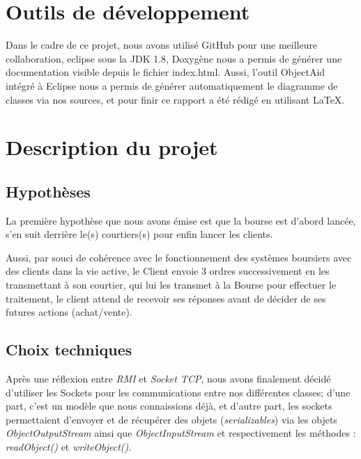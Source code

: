 \documentclass[11pt]{article}
\begin{document}
\section{Outils de développement}

Dans le cadre de ce projet, nous avons utilisé GitHub pour une meilleure collaboration, eclipse sous la JDK 1.8, Doxygène nous a permis de générer une documentation visible depuis le fichier index.html. \newline Aussi, l'outil ObjectAid intégré à Eclipse nous a permis de générer automatiquement le diagramme de classes via nos sources, et pour finir ce rapport a été rédigé en utilisant LaTeX.


\section{Description du projet}

\subsection{Hypothèses}

La première hypothèse que nous avons émise est que la bourse est d'abord lancée, s'en suit derrière le(s) courtiers(s) pour enfin lancer les clients. \newline

Aussi, par souci de cohérence avec le fonctionnement des systèmes boursiers avec des clients dans la vie active, le Client envoie 3 ordres successivement en les transmettant à son courtier, qui lui les transmet à la Bourse pour effectuer le traitement, le client attend de recevoir ses réponses avant de décider de ses futures actions (achat/vente). \newline


\clearpage

\subsection{Choix techniques}

Après une réflexion  entre \textit{RMI} et \textit{Socket TCP}, nous avons finalement décidé d'utiliser les Sockets pour les communications entre nos différentes classes; d'une part, c'est un modèle que nous connaissions déjà, et d'autre part, les sockets permettaient d'envoyer et de récupérer des objets (\textit{serializables}) via les objets \textit{ObjectOutputStream} ainsi que \textit{ObjectInputStream} et respectivement les méthodes : \textit{readObject()} et \textit{writeObject()}. \newline 
\end{document}
